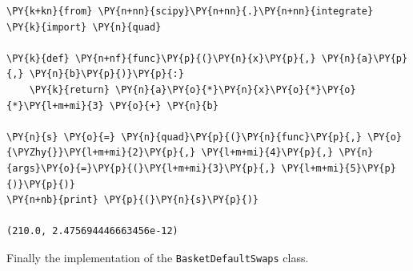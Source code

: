 \begin{tcolorbox}[breakable, size=fbox, boxrule=1pt, pad at break*=1mm,colback=cellbackground, colframe=cellborder]
\begin{Verbatim}[commandchars=\\\{\}]
\PY{k+kn}{from} \PY{n+nn}{scipy}\PY{n+nn}{.}\PY{n+nn}{integrate} \PY{k}{import} \PY{n}{quad}
	
\PY{k}{def} \PY{n+nf}{func}\PY{p}{(}\PY{n}{x}\PY{p}{,} \PY{n}{a}\PY{p}{,} \PY{n}{b}\PY{p}{)}\PY{p}{:}
    \PY{k}{return} \PY{n}{a}\PY{o}{*}\PY{n}{x}\PY{o}{*}\PY{o}{*}\PY{l+m+mi}{3} \PY{o}{+} \PY{n}{b}
	
\PY{n}{s} \PY{o}{=} \PY{n}{quad}\PY{p}{(}\PY{n}{func}\PY{p}{,} \PY{o}{\PYZhy{}}\PY{l+m+mi}{2}\PY{p}{,} \PY{l+m+mi}{4}\PY{p}{,} \PY{n}{args}\PY{o}{=}\PY{p}{(}\PY{l+m+mi}{3}\PY{p}{,} \PY{l+m+mi}{5}\PY{p}{)}\PY{p}{)}
\PY{n+nb}{print} \PY{p}{(}\PY{n}{s}\PY{p}{)}

(210.0, 2.475694446663456e-12)
\end{Verbatim}
\end{tcolorbox}

Finally the implementation of the \texttt{BasketDefaultSwaps} class.

